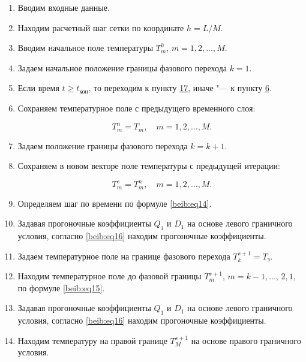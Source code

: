 \begin{enumerate}

\item Вводим входные данные.

\item Находим расчетный шаг сетки по координате $h= {L}/{M}$.

\item Вводим начальное поле температуры $T_m^0$, $m=1,2,\ldots,M$.

\item Задаем начальное положение границы фазового перехода $k=1$.

\item Если время $t\ge t_{\text{кон}}$, то переходим к пункту \hyperlink{p17}{17}, иначе "--- к пункту \hyperlink{p6}{6}.

\item \hypertarget{p6}{} Сохраняем температурное поле с предыдущего временного слоя:

\[

T^n_m =T_m ,\quad m=1,2,\ldots,M.

\]

\item Задаем положение границы фазового перехода $k=k+1$.

\item Сохраняем в новом векторе поле температуры с предыдущей итерации: 

$$T^s_m =T_m^n,\quad m=1,2,\ldots,M.$$

\item \hypertarget{p9}{} Определяем шаг по времени по формуле \eqref{beib:eq14}.

\item Задавая прогоночные коэффициенты $Q_1 $ и $D_1 $ на основе левого граничного условия, согласно \eqref{beib:eq16} находим прогоночные коэффициенты.

\item Задаем температурное поле на границе фазового перехода $T_k^{s+1} =T_{\text{з}}$.

\item Находим температурное поле до фазовой границы $T_m^{s+1}$, $m={k-1},\ldots$, $ 2, 1,$ по формуле \eqref{beib:eq15}.

\item Задавая прогоночные коэффициенты $Q_1 $ и $D_1 $ на основе левого граничного условия, согласно \eqref{beib:eq16} находим прогоночные коэффициенты.

\item Находим температуру на правой границе $T_M^{s+1} $ на основе правого граничного условия.


\end{enumerate}
